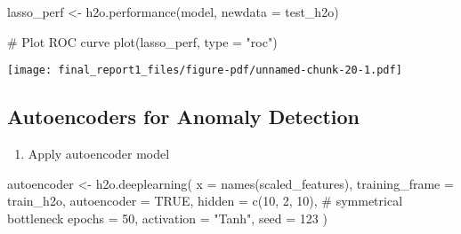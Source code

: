 \documentclass[
  11pt,
  letterpaper,
  DIV=11,
  numbers=noendperiod]{scrartcl}
\newenvironment{Shaded}{}{}
\newcommand{\AttributeTok}[1]{\textcolor[rgb]{0.84,0.23,0.29}{#1}}
\newcommand{\CommentTok}[1]{\textcolor[rgb]{0.42,0.45,0.49}{#1}}
\newcommand{\ConstantTok}[1]{\textcolor[rgb]{0.00,0.36,0.77}{#1}}
\newcommand{\DecValTok}[1]{\textcolor[rgb]{0.00,0.36,0.77}{#1}}
\newcommand{\FunctionTok}[1]{\textcolor[rgb]{0.44,0.26,0.76}{#1}}
\newcommand{\NormalTok}[1]{\textcolor[rgb]{0.14,0.16,0.18}{#1}}
\newcommand{\OtherTok}[1]{\textcolor[rgb]{0.44,0.26,0.76}{#1}}
\newcommand{\StringTok}[1]{\textcolor[rgb]{0.01,0.18,0.38}{#1}}
\providecommand{\tightlist}{%
  \setlength{\itemsep}{0pt}\setlength{\parskip}{0pt}}\usepackage{longtable,booktabs,array}
\begin{document}
\begin{Shaded}
\begin{Highlighting}[]
\NormalTok{lasso\_perf }\OtherTok{\textless{}{-}} \FunctionTok{h2o.performance}\NormalTok{(model, }\AttributeTok{newdata =}\NormalTok{ test\_h2o)}

\CommentTok{\# Plot ROC curve}
\FunctionTok{plot}\NormalTok{(lasso\_perf, }\AttributeTok{type =} \StringTok{"roc"}\NormalTok{)}
\end{Highlighting}
\end{Shaded}

\texttt{[image: final\_report1\_files/figure-pdf/unnamed-chunk-20-1.pdf]}

\subsection{Autoencoders for Anomaly
Detection}\label{autoencoders-for-anomaly-detection}

\begin{enumerate}
\def\labelenumi{\arabic{enumi}.}
\tightlist
\item
  Apply autoencoder model
\end{enumerate}

\begin{Shaded}
\begin{Highlighting}[]
\NormalTok{autoencoder }\OtherTok{\textless{}{-}} \FunctionTok{h2o.deeplearning}\NormalTok{(}
  \AttributeTok{x =} \FunctionTok{names}\NormalTok{(scaled\_features),}
  \AttributeTok{training\_frame =}\NormalTok{ train\_h2o,}
  \AttributeTok{autoencoder =} \ConstantTok{TRUE}\NormalTok{,}
  \AttributeTok{hidden =} \FunctionTok{c}\NormalTok{(}\DecValTok{10}\NormalTok{, }\DecValTok{2}\NormalTok{, }\DecValTok{10}\NormalTok{),  }\CommentTok{\# symmetrical bottleneck}
  \AttributeTok{epochs =} \DecValTok{50}\NormalTok{,}
  \AttributeTok{activation =} \StringTok{"Tanh"}\NormalTok{,}
  \AttributeTok{seed =} \DecValTok{123}
\NormalTok{)}
\end{Highlighting}
\end{Shaded}
\end{document}
